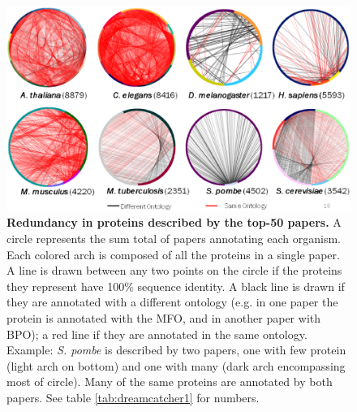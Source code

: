 \documentclass[12pt]{article}
\begin{document}
\begin{figure}[!ht] \begin{center} \includegraphics[width=7in]{dreamcatcher1.eps} \end{center}
\caption{ {\bf Redundancy in proteins described by the top-50 papers.} A circle represents the sum
total of papers annotating each organism. Each colored arch is composed of all the proteins in a
single paper. A line is drawn between any two points on the circle if the proteins they represent
have 100\% sequence identity. A black line is drawn if they are annotated with a different ontology
(e.g.  in one paper the protein is annotated with the MFO, and in another paper with BPO); a red
line if they are annotated in the same ontology. Example: \textit{S. pombe} is described by two
papers, one with few protein (light arch on bottom) and one with many (dark arch encompassing most
of circle). Many of the same proteins are annotated by both papers. See table
\ref{tab:dreamcatcher1} for numbers.} 
\label{fig:dreamcatcher1} 
\end{figure}
\end{document}
